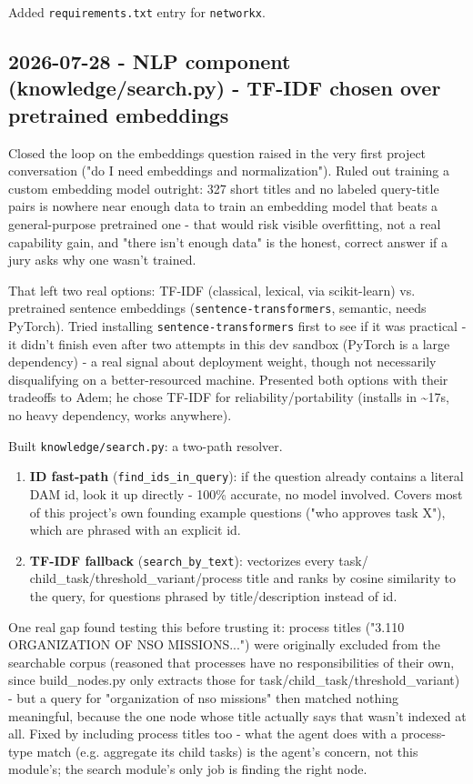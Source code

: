 Added \texttt{requirements.txt} entry for \texttt{networkx}.

\subsection*{2026-07-28 - NLP component (knowledge/search.py) - TF-IDF chosen over pretrained embeddings}
Closed the loop on the embeddings question raised in the very first project conversation ("do I need embeddings and normalization"). Ruled out training a custom embedding model outright: 327 short titles and no labeled query-title pairs is nowhere near enough data to train an embedding model that beats a general-purpose pretrained one - that would risk visible overfitting, not a real capability gain, and "there isn't enough data" is the honest, correct answer if a jury asks why one wasn't trained.

That left two real options: TF-IDF (classical, lexical, via scikit-learn) vs. pretrained sentence embeddings (\texttt{sentence-transformers}, semantic, needs PyTorch). Tried installing \texttt{sentence-transformers} first to see if it was practical - it didn't finish even after two attempts in this dev sandbox (PyTorch is a large dependency) - a real signal about deployment weight, though not necessarily disqualifying on a better-resourced machine. Presented both options with their tradeoffs to Adem; he chose TF-IDF for reliability/portability (installs in \textasciitilde{}17s, no heavy dependency, works anywhere).

Built \texttt{knowledge/\allowbreak{}search.py}: a two-path resolver.

\begin{enumerate}
\item \textbf{ID fast-path} (\texttt{find\_\allowbreak{}ids\_\allowbreak{}in\_\allowbreak{}query}): if the question already contains a literal DAM id, look it up directly - 100\% accurate, no model involved. Covers most of this project's own founding example questions ("who approves task X"), which are phrased with an explicit id.
\item \textbf{TF-IDF fallback} (\texttt{search\_\allowbreak{}by\_\allowbreak{}text}): vectorizes every task/ child\_task/threshold\_variant/process title and ranks by cosine similarity to the query, for questions phrased by title/description instead of id.
\end{enumerate}
One real gap found testing this before trusting it: process titles ("3.110 ORGANIZATION OF NSO MISSIONS...") were originally excluded from the searchable corpus (reasoned that processes have no responsibilities of their own, since build\_nodes.py only extracts those for task/child\_task/threshold\_variant) - but a query for "organization of nso missions" then matched nothing meaningful, because the one node whose title actually says that wasn't indexed at all. Fixed by including process titles too - what the agent does with a process-type match (e.g. aggregate its child tasks) is the agent's concern, not this module's; the search module's only job is finding the right node.

